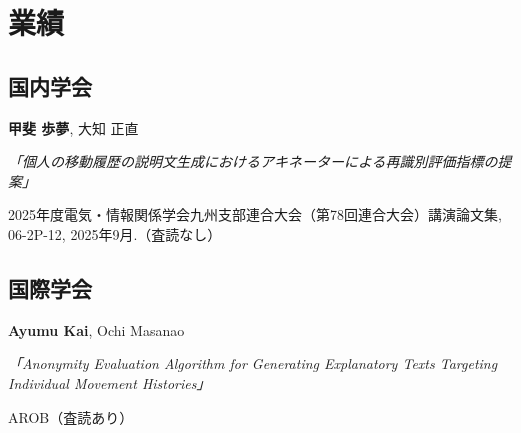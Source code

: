 
\chapter*{業績}

\section*{国内学会}

\begin{enumerate}[label={[\arabic*]}, leftmargin=3.5em, labelsep=1em, itemsep=1.5ex]
    \item \textbf{甲斐 歩夢}, 大知 正直
    \par \textit{「個人の移動履歴の説明文生成におけるアキネーターによる再識別評価指標の提案」}
    \par 2025年度電気・情報関係学会九州支部連合大会（第78回連合大会）講演論文集, 06-2P-12, 2025年9月.（査読なし）

\end{enumerate}

\section*{国際学会}

\begin{enumerate}[label={[\arabic*]}, leftmargin=3.5em, labelsep=1em, itemsep=1.5ex]
    \item \textbf{Ayumu Kai}, Ochi Masanao
    \par \textit{「Anonymity Evaluation  Algorithm for Generating Explanatory Texts Targeting Individual Movement Histories」}
    \par AROB（査読あり）

\end{enumerate}